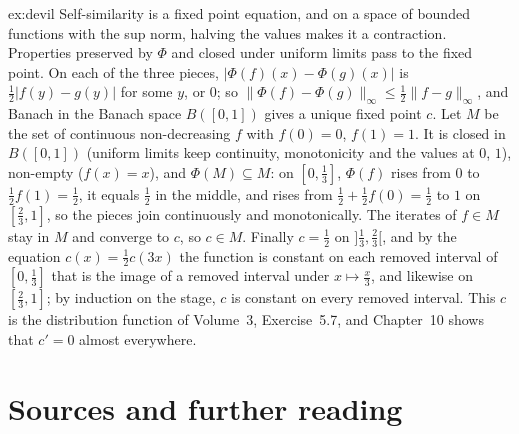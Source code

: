 \begin{solution}{ex:devil}
\idea Self-similarity is a fixed point equation, and on a space of bounded functions with the sup norm, halving the values makes
it a contraction. Properties preserved by $\Phi$ and closed under uniform limits pass to the fixed point.
\writeup On each of the three pieces, $|\Phi(f)(x)-\Phi(g)(x)|$ is $\frac12|f(y)-g(y)|$ for some $y$, or $0$; so $\|\Phi(f)-\Phi(g)\|_\infty\le\frac12\|f-g\|_\infty$, and Banach in the
Banach space $B([0,1])$ gives a unique fixed point $c$. Let $M$ be the set of continuous non-decreasing $f$ with $f(0)=0$, $f(1)=1$. It is closed in $B([0,1])$
(uniform limits keep continuity, monotonicity and the values at $0$, $1$), non-empty ($f(x)=x$), and $\Phi(M)\subseteq M$: on $[0,\frac13]$, $\Phi(f)$ rises from $0$ to
$\frac12f(1)=\frac12$, it equals $\frac12$ in the middle, and rises from $\frac12+\frac12f(0)=\frac12$ to $1$ on $[\frac23,1]$, so the pieces join continuously and monotonically. The
iterates of $f\in M$ stay in $M$ and converge to $c$, so $c\in M$. Finally $c=\frac12$ on $]\frac13,\frac23[$, and by the equation $c(x)=\frac12c(3x)$ the function is constant on
each removed interval of $[0,\frac13]$ that is the image of a removed interval under $x\mapsto\frac x3$, and likewise on $[\frac23,1]$; by induction on the stage, $c$ is
constant on every removed interval. This $c$ is the distribution function of Volume~3, Exercise~5.7, and Chapter~10 shows that $c'=0$ almost
everywhere.
\end{solution}

\section*{Sources and further reading}

